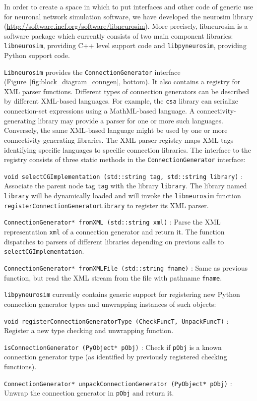 \documentclass{frontiersSCNS} %
\newcommand{\Figure}[2]{Figure~\ref{#2}}
\newcommand{\Figure}[2]{Figure~#1}
\begin{document}
In order to create a space in which to put interfaces and other code
of generic use for neuronal network simulation software, we have
developed the neurosim library
(\url{http://software.incf.org/software/libneurosim}).  More
precisely, libneurosim is a software package which currently consists
of two main component libraries: \verb|libneurosim|, providing C++
level support code and \verb|libpyneurosim|, providing Python support
code.

\verb|Libneurosim| provides the \verb|ConnectionGenerator| interface
(\Figure{2}{fig:block_diagram_conngen}, bottom). It also contains a
registry for XML parser functions.  Different types of connection
generators can be described by different XML-based languages.  For
example, the \verb|csa| library can serialize connection-set
expressions using a MathML-based language.  A connectivity-generating
library may provide a parser for one or more such languages.
Conversely, the same XML-based language might be used by one or more
connectivity-generating libraries.  The XML parser registry maps XML
tags identifying specific languages to specific connection libraries.
The interface to the registry consists of three static methods in the
\verb|ConnectionGenerator| interface:

\begin{unlist}
\item[\tt void selectCGImplementation (std::string tag, std::string
  library)]:\\ Associate the parent node tag \verb|tag| with the library
  \verb|library|.  The library named \verb|library| will be
  dynamically loaded and will invoke the \verb|libneurosim| function
  \verb|registerConnectionGeneratorLibrary| to register its XML
  parser.
\item[\tt ConnectionGenerator* fromXML (std::string xml)]: Parse the
  XML representation \verb|xml| of a connection generator and return
  it. The function dispatches to parsers of different libraries
  depending on previous calls to \verb|selectCGImplementation|.
\item[\tt ConnectionGenerator* fromXMLFile (std::string fname)]: Same
  as previous function, but read the XML stream from the file with
  pathname \verb|fname|.
\end{unlist}

\verb|libpyneurosim| currently contains generic support for
registering new Python connection generator types and unwrapping
instances of such objects:

\begin{unlist}
\item[\tt void registerConnectionGeneratorType (CheckFuncT,
  UnpackFuncT)]: Register a new type checking and unwrapping
  function.
\item[\tt isConnectionGenerator (PyObject* pObj)]: Check if
  \verb|pObj| is a known connection generator type (as identified by
  previously registered checking functions).
\item[\tt ConnectionGenerator* unpackConnectionGenerator (PyObject*
  pObj)]: Unwrap the connection generator in \verb|pObj| and return
  it.
\end{unlist}
\end{document}
